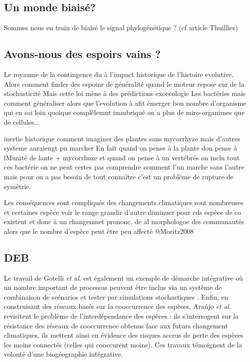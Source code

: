 \subsection*{Un monde biaisé?}\label{un-monde-biaisuxe9}

Sommes nous en train de biaisé le signal phylogénétique ? (cf article
Thuillier)

\subsection{Avons-nous des espoirs vains
?}\label{avons-nous-des-espoirs-vains}

Le royaume de la contingence du à l'impact historique de l'histoire
evolutive. Alors comment finder des espoinr de généralité quand le
moteur repose sur de la stochasticité Mais cette loi mène à des
prédictions exoecologie Les bactéries mais comment généraliser alors que
l'evolution à afit émerger bon nombre d'organisme qui en soi loin
quoique complèlemnt immbriqué on a plus de miro-organimes que de
cellules\ldots{}

inertie historique comment imaginer des plantes sans mycorrhyze mais
d'autres systeme auraiengt pu marcher En fait quand on pense à la plante
don pense à lMunité de lante + mycorrhuze et quand on pense à un
vertébrés on inclu tout ces bactérie on ne peut certes pas comprendre
comment l'un marche sans l'autre mais pour on a pas besoin de tout
connaître c'est un problème de rupture de symétrie.

Les conséquences sont compliqués des changements climatiques sont
nombreuses et certaines espèce voir le range grandir d'autre diminuer
pour cds espèce de co existent et donc à un changemnet prononc. de al
morphologoe des communautés alors que le nombre d'espèce peut être peu
affecté @Moritz2008

\subsection{DEB}\label{deb}

Le travail de Gotelli \textit{et al.} est également un exemple de
démarche intégrative où un nombre important de processus peuvent être
inclus via un système de combinaison de scénarios et tester par
simulations stochastiques \cite{Gotelli2009}. Enfin, en construisant des
réseaux basés sur la cooccurrence des espèces, Araújo \textit{et al.}
revisitent le problème de l'interdépendance des espèces
\cite{Araujo2011} : ils s'interrogent sur la résistance des réseaux de
cooccurrence obtenus face aux futurs changement climatiques, ils mettent
ainsi en évidence des risques accrus de perte des espèces les moins
connectés (celles qui cooccurent moins). Ces travaux témoignent de la
volonté d'une biogéographie intégrative.

